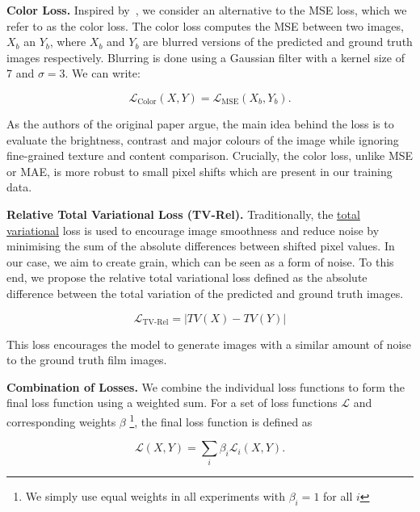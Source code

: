 \textbf{Color Loss.} Inspired by~\cite{dslr-quality}, we consider an alternative to the MSE loss, which we refer to as the color loss. The color loss computes the MSE between two images, $X_b$ an $Y_b$, where $X_b$ and $Y_b$ are blurred versions of the predicted and ground truth images respectively. Blurring is done using a Gaussian filter with a kernel size of 7 and \(\sigma=3\). We can write:

\begin{equation}
    \mathcal{L}_\text{Color}(X, Y) = \mathcal{L}_\text{MSE}(X_b, Y_b).
    \label{eq:color}
\end{equation}

As the authors of the original paper argue, the main idea behind the loss is to evaluate the brightness, contrast and major colours of the image while ignoring fine-grained texture and content comparison. Crucially, the color loss, unlike MSE or MAE, is more robust to small pixel shifts which are present in our training data.

\textbf{Relative Total Variational Loss (TV-Rel).} Traditionally, the \href{https://lightning.ai/docs/torchmetrics/stable/image/total_variation.html}{total variational} loss is used to encourage image smoothness and reduce noise by minimising the sum of the absolute differences between shifted pixel values. In our case, we aim to create grain, which can be seen as a form of noise. To this end, we propose the relative total variational loss defined as the absolute difference between the total variation of the predicted and ground
truth images. 

\begin{equation}
    \mathcal{L}_\text{TV-Rel} = |TV(X) - TV(Y)| 
    \label{eq:tv-rel}
  \end{equation}

This loss encourages the model to generate images with a similar
amount of noise to the ground truth film images.

\textbf{Combination of Losses.} We combine the individual loss functions to form the final loss function using a weighted sum. For a set of loss functions $\mathcal{L}$ and corresponding weights $\beta$ \footnote{We simply use equal weights in all experiments with $\beta_i = 1$ for all $i$}, the final loss function is defined as

\begin{equation}
    \mathcal{L}(X, Y) = \sum_{i} \beta_i \mathcal{L}_i(X, Y).
    \label{eq:combined-loss}
\end{equation}

